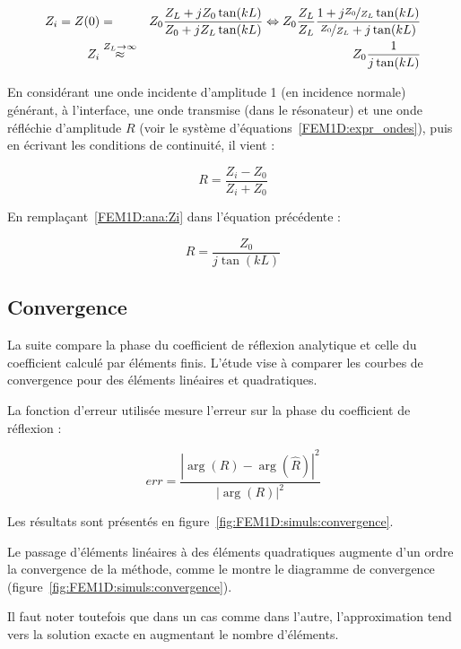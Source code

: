 \begin{eqnarray}
	Z_i = Z(0) 	& = & Z_0 \frac{Z_L+jZ_0\tan(kL)}{Z_0 + jZ_L\tan(kL)} \Leftrightarrow  Z_0 \frac{Z_L}{Z_L}\frac{1+j\nicefrac{Z_0}{Z_L}\tan(kL)}{\nicefrac{Z_0}{Z_L} + j\tan(kL)}\notag\\
		    Z_i & \overset{Z_L\rightarrow\infty}{\approx} & Z_0\frac{1}{j\tan(kL)}\label{FEM1D:ana:Zi}
\end{eqnarray}

En considérant une onde incidente d'amplitude 1 (en incidence normale) générant, à l'interface, une onde transmise (dans le
résonateur) et une onde réfléchie d'amplitude $R$ (voir le système d'équations~\eqref{FEM1D:expr_ondes}), puis en écrivant les
conditions de continuité, il vient :

\begin{equation*}
	R = \frac{Z_i-Z_0}{Z_i+Z_0}
\end{equation*}

En remplaçant~\eqref{FEM1D:ana:Zi} dans l'équation précédente :

\begin{equation}
	R = \frac{Z_0}{j\tan(kL)}\label{FEM1D:ana:R}
\end{equation}

\subsection{Convergence}

La suite compare la phase du coefficient de réflexion analytique et celle du coefficient calculé par éléments
finis. L'étude vise à comparer les courbes de convergence pour des éléments linéaires et quadratiques.

La fonction d'erreur utilisée mesure l'erreur sur la phase du coefficient de réflexion :

\begin{equation}
	err = \frac{\left|\arg(R) - \arg(\hat{R})\right|^2}{\left|\arg(R)\right|^2}
    \label{FEM1D:errf}
\end{equation}


Les résultats sont présentés en figure~\ref{fig:FEM1D:simuls:convergence}.

Le passage d'éléments linéaires à des éléments quadratiques augmente d'un ordre la convergence de la méthode, comme le
montre le diagramme de convergence (figure~\ref{fig:FEM1D:simuls:convergence}).

Il faut noter toutefois que dans un cas comme dans l'autre, l'approximation tend vers la solution exacte en augmentant
le nombre d'éléments.

